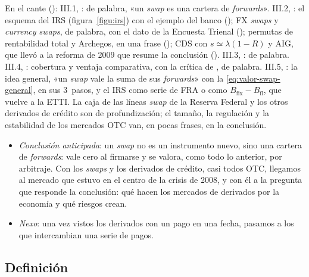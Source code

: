 \documentclass[11pt]{article}
\begin{document}
\begin{notaopositor}
En el cante (): III.1, : de palabra, «un \emph{swap} es una cartera de \emph{forwards}». III.2, : el esquema del IRS (figura~\ref{figu:irs}) con el ejemplo del banco (); FX \emph{swaps} y \emph{currency swaps}, de palabra, con el dato de la Encuesta Trienal (); permutas de rentabilidad total y Archegos, en una frase (); CDS con $s\simeq\lambda(1-R)$ y AIG, que llevó a la reforma de 2009 que resume la conclusión (). III.3, : de palabra. III.4, : cobertura y ventaja comparativa, con la crítica de , de palabra. III.5, : la idea general, «un \emph{swap} vale la suma de sus \emph{forwards}» con la \eqref{eq:valor-swap-general}, en sus 3~pasos, y el IRS como serie de FRA o como $B_{\mathrm{fix}}-B_{\mathrm{fl}}$, que vuelve a la ETTI. La caja de las líneas \emph{swap} de la Reserva Federal y los otros derivados de crédito son de profundización; el tamaño, la regulación y la estabilidad de los mercados OTC van, en pocas frases, en la conclusión.
\end{notaopositor}

\begin{itemize}
\item \emph{Conclusión anticipada}: un \emph{swap} no es un instrumento nuevo, sino una cartera de \emph{forwards}: vale cero al firmarse y se valora, como todo lo anterior, por arbitraje. Con los \emph{swaps} y los derivados de crédito, casi todos OTC, llegamos al mercado que estuvo en el centro de la crisis de 2008, y con él a la pregunta que responde la conclusión: qué hacen los mercados de derivados por la economía y qué riesgos crean.
\item \emph{Nexo}: una vez vistos los derivados con un pago en una fecha, pasamos a los que intercambian una serie de pagos.
\end{itemize}

\subsection{Definición}\label{sec:definicion-swaps}
\end{document}
